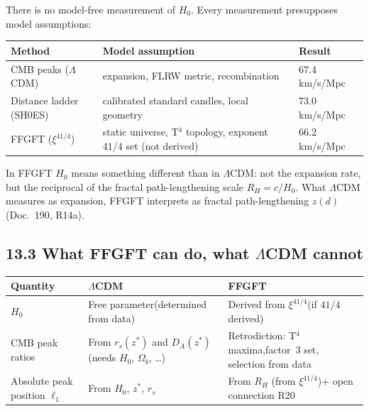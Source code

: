 There is no model-free measurement of $H_0$.
Every measurement presupposes model assumptions:

\begin{center}
\begin{tabular}{p{3.5cm}p{5.5cm}p{3cm}}
\toprule
\textbf{Method} & \textbf{Model assumption} & \textbf{Result} \\
\midrule
CMB peaks ($\Lambda$CDM) &
  expansion, FLRW metric, recombination &
  $67{.}4$ km/s/Mpc \\
\addlinespace
Distance ladder (SH0ES) &
  calibrated standard candles, local geometry &
  $73{.}0$ km/s/Mpc \\
\addlinespace
FFGFT ($\xi^{41/4}$) &
  static universe, T$^4$ topology,\newline
  exponent $41/4$ set (not derived) &
  $66{.}2$ km/s/Mpc \\
\bottomrule
\end{tabular}
\end{center}

In FFGFT $H_0$ means something different than in $\Lambda$CDM:
not the expansion rate, but the reciprocal of the
fractal path-lengthening scale $R_H = c/H_0$.
What $\Lambda$CDM measures as expansion, FFGFT interprets
as fractal path-lengthening $z(d)$ (Doc.~190, R14a).

\subsection*{13.3 What FFGFT can do, what $\Lambda$CDM cannot}

\begin{center}
\begin{tabular}{p{5cm}p{4.5cm}p{4.5cm}}
\toprule
\textbf{Quantity} & \textbf{$\Lambda$CDM} & \textbf{FFGFT} \\
\midrule
$H_0$ &
  Free parameter\newline (determined from data) &
  Derived from $\xi^{41/4}$\newline (if $41/4$ derived) \\
\addlinespace
CMB peak ratios &
  From $r_s(z^*)$ and $D_A(z^*)$\newline (needs $H_0$, $\Omega_b$, \ldots) &
  Retrodiction: T$^4$ maxima,\newline factor~3 set, selection from data \\
\addlinespace
Absolute peak position $\ell_1$ &
  From $H_0$, $z^*$, $r_s$ &
  From $R_H$ (from $\xi^{41/4}$)\newline + open connection R20 \\
\bottomrule
\end{tabular}
\end{center}

